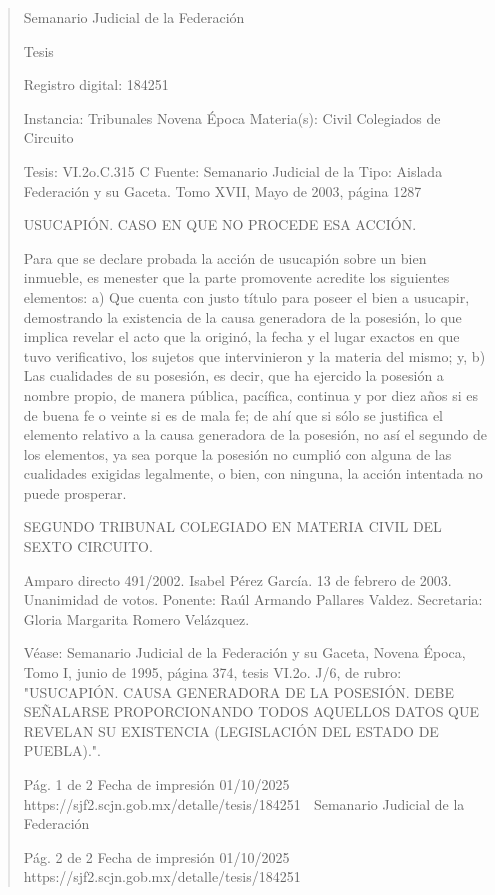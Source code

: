 \documentclass[11pt,a4paper]{article}
\begin{document}
\begin{quote}
                                                   Semanario Judicial de la Federación

                                                  Tesis

 Registro digital: 184251

 Instancia: Tribunales             Novena Época                           Materia(s): Civil
 Colegiados de Circuito

 Tesis: VI.2o.C.315 C              Fuente: Semanario Judicial de la       Tipo: Aislada
                                   Federación y su Gaceta.
                                   Tomo XVII, Mayo de 2003, página
                                   1287


USUCAPIÓN. CASO EN QUE NO PROCEDE ESA ACCIÓN.


Para que se declare probada la acción de usucapión sobre un bien inmueble, es menester que la
parte promovente acredite los siguientes elementos: a) Que cuenta con justo título para poseer el
bien a usucapir, demostrando la existencia de la causa generadora de la posesión, lo que implica
revelar el acto que la originó, la fecha y el lugar exactos en que tuvo verificativo, los sujetos que
intervinieron y la materia del mismo; y, b) Las cualidades de su posesión, es decir, que ha ejercido
la posesión a nombre propio, de manera pública, pacífica, continua y por diez años si es de buena
fe o veinte si es de mala fe; de ahí que si sólo se justifica el elemento relativo a la causa generadora
de la posesión, no así el segundo de los elementos, ya sea porque la posesión no cumplió con
alguna de las cualidades exigidas legalmente, o bien, con ninguna, la acción intentada no puede
prosperar.

SEGUNDO TRIBUNAL COLEGIADO EN MATERIA CIVIL DEL SEXTO CIRCUITO.


Amparo directo 491/2002. Isabel Pérez García. 13 de febrero de 2003. Unanimidad de votos.
Ponente: Raúl Armando Pallares Valdez. Secretaria: Gloria Margarita Romero Velázquez.

Véase: Semanario Judicial de la Federación y su Gaceta, Novena Época, Tomo I, junio de 1995,
página 374, tesis VI.2o. J/6, de rubro: "USUCAPIÓN. CAUSA GENERADORA DE LA POSESIÓN.
DEBE SEÑALARSE PROPORCIONANDO TODOS AQUELLOS DATOS QUE REVELAN SU
EXISTENCIA (LEGISLACIÓN DEL ESTADO DE PUEBLA).".




                                              Pág. 1 de 2              Fecha de impresión 01/10/2025
  https://sjf2.scjn.gob.mx/detalle/tesis/184251
                                                Semanario Judicial de la Federación




                                           Pág. 2 de 2       Fecha de impresión 01/10/2025
https://sjf2.scjn.gob.mx/detalle/tesis/184251

\end{quote}
\end{document}
